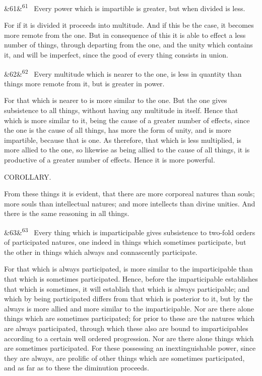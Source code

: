 \documentclass[12pt]{article}
\newcommand{\para}[1][]{\par\noindent\ifx&#1&\else\textsuperscript{\footnotesize #1}~\fi}
\begin{document}
\para[61] Every power which is impartible is greater, but when divided is less.

For if it is divided it proceeds into multitude. And if this be the case, it becomes more remote from the one. But in consequence of this it is able to effect a less number of things, through departing from the one, and the unity which contains it, and will be imperfect, since the good of every thing consists in union.

\para[62] Every multitude which is nearer to the one, is less in quantity than things more remote from it, but is greater in power.

For that which is nearer to is more similar to the one. But the one gives subsistence to all things, without having any multitude in itself. Hence that which is more similar to it, being the cause of a greater number of effects, since the one is the cause of all things, has more the form of unity, and is more impartible, because that is one. As therefore, that which is less multiplied, is more allied to the one, so likewise as being allied to the cause of all things, it is productive of a greater number of effects. Hence it is more powerful.

COROLLARY.

From these things it is evident, that there are more corporeal natures than souls; more souls than intellectual natures; and more intellects than divine unities. And there is the same reasoning in all things.

\para[63] Every thing which is imparticipable gives subsistence to two-fold orders of participated natures, one indeed in things which sometimes participate, but the other in things which always and connascently participate.

For that which is always participated, is more similar to the imparticipable than that which is sometimes participated. Hence, before the imparticipable establishes that which is sometimes, it will establish that which is always participable; and which by being participated differs from that which is posterior to it, but by the always is more allied and more similar to the imparticipable. Nor are there alone things which are sometimes participated; for prior to these are the natures which are always participated, through which these also are bound to imparticipables according to a certain well ordered progression. Nor are there alone things which are sometimes participated. For these possessing an inextinguishable power, since they are always, are prolific of other things which are sometimes participated, and as far as to these the diminution proceeds.
\end{document}
